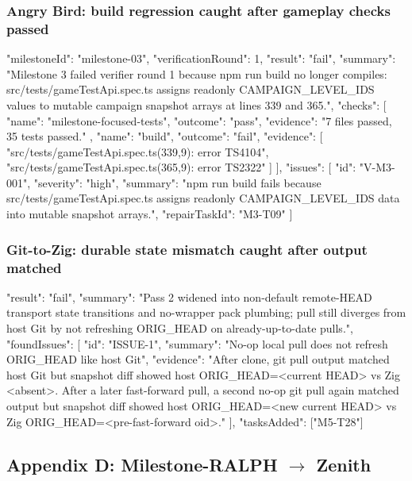 \documentclass[11pt,a4paper]{article}
\begin{document}
\subsubsection{Angry Bird: build regression caught after gameplay checks passed}

\begin{cbox}
{
  "milestoneId": "milestone-03",
  "verificationRound": 1,
  "result": "fail",
  "summary": "Milestone 3 failed verifier round 1 because npm run build no longer compiles: src/tests/gameTestApi.spec.ts assigns readonly CAMPAIGN_LEVEL_IDS values to mutable campaign snapshot arrays at lines 339 and 365.",
  "checks": [
    { "name": "milestone-focused-tests", "outcome": "pass", "evidence": "7 files passed, 35 tests passed." },
    { "name": "build", "outcome": "fail",
      "evidence": [
        "src/tests/gameTestApi.spec.ts(339,9): error TS4104",
        "src/tests/gameTestApi.spec.ts(365,9): error TS2322"
      ] }
  ],
  "issues": [
    { "id": "V-M3-001", "severity": "high",
      "summary": "npm run build fails because src/tests/gameTestApi.spec.ts assigns readonly CAMPAIGN_LEVEL_IDS data into mutable snapshot arrays.",
      "repairTaskId": "M3-T09" }
  ]
}
\end{cbox}

\subsubsection{Git-to-Zig: durable state mismatch caught after output matched}

\begin{cbox}
{
  "result": "fail",
  "summary": "Pass 2 widened into non-default remote-HEAD transport state transitions and no-wrapper pack plumbing; pull still diverges from host Git by not refreshing ORIG_HEAD on already-up-to-date pulls.",
  "foundIssues": [
    { "id": "ISSUE-1",
      "summary": "No-op local pull does not refresh ORIG_HEAD like host Git",
      "evidence": "After clone, git pull output matched host Git but snapshot diff showed host ORIG_HEAD=<current HEAD> vs Zig <absent>. After a later fast-forward pull, a second no-op git pull again matched output but snapshot diff showed host ORIG_HEAD=<new current HEAD> vs Zig ORIG_HEAD=<pre-fast-forward oid>." }
  ],
  "tasksAdded": ["M5-T28"]
}
\end{cbox}

\subsection{Appendix D: Milestone-RALPH $\rightarrow$ Zenith}
\end{document}
